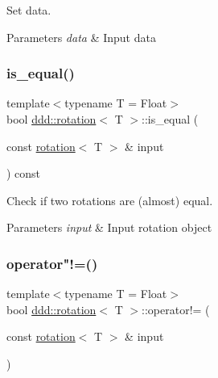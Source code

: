 Set data. 


\begin{DoxyParams}{Parameters}
{\em data} & Input data \\
\hline
\end{DoxyParams}
\mbox{\label{classddd_1_1rotation_a3af65c771a81cd62655802ce3ee22614}} 
\subsubsection{\texorpdfstring{is\+\_\+equal()}{is\_equal()}}
{\footnotesize\ttfamily template$<$typename T  = Float$>$ \\
bool \hyperlink{classddd_1_1rotation}{ddd\+::rotation}$<$ T $>$\+::is\+\_\+equal (\begin{DoxyParamCaption}\item[{const \hyperlink{classddd_1_1rotation}{rotation}$<$ T $>$ \&}]{input }\end{DoxyParamCaption}) const\hspace{0.3cm}{\ttfamily [inline]}}



Check if two rotations are (almost) equal. 


\begin{DoxyParams}{Parameters}
{\em input} & Input rotation object \\
\hline
\end{DoxyParams}
\mbox{\label{classddd_1_1rotation_abfeae27a919ada418d2cdcce96e5e08d}} 
\subsubsection{\texorpdfstring{operator"!=()}{operator!=()}}
{\footnotesize\ttfamily template$<$typename T  = Float$>$ \\
bool \hyperlink{classddd_1_1rotation}{ddd\+::rotation}$<$ T $>$\+::operator!= (\begin{DoxyParamCaption}\item[{const \hyperlink{classddd_1_1rotation}{rotation}$<$ T $>$ \&}]{input }\end{DoxyParamCaption})\hspace{0.3cm}{\ttfamily [inline]}}



